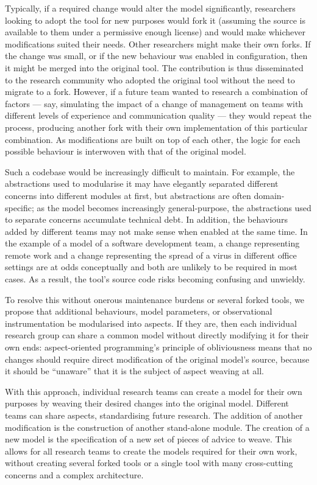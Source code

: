 Typically, if a required change would alter the model significantly, researchers
looking to adopt the tool for new purposes would fork it (assuming the source is
available to them under a permissive enough license) and would make whichever
modifications suited their needs. Other researchers might make their own forks.
If the change was small, or if the new behaviour was enabled in configuration,
then it might be merged into the original tool. The contribution is thus
disseminated to the research community who adopted the original tool without the
need to migrate to a fork. However, if a future team wanted to research a
combination of factors --- say, simulating the impact of a change of management
on teams with different levels of experience and communication quality --- they
would repeat the process, producing another fork with their own implementation
of this particular combination. As modifications are built on top of each other,
the logic for each possible behaviour is interwoven with that of the original
model.

Such a codebase would be increasingly difficult to maintain. For example, the
abstractions used to modularise it may have elegantly separated different
concerns into different modules at first, but abstractions are often
domain-specific; as the model becomes increasingly general-purpose, the
abstractions used to separate concerns accumulate technical debt. In addition,
the behaviours added by different teams may not make sense when enabled at the
same time. In the example of a model of a software development team, a change
representing remote work and a change representing 
the spread of a virus in different office settings are at odds conceptually and
both are unlikely to be required in most cases. As a result, the tool's source
code risks becoming confusing and unwieldy.

To resolve this without onerous maintenance burdens or several forked tools, we
propose that additional behaviours, model parameters, or observational
instrumentation be 
modularised into aspects. If they are, then each individual research group can
share a common model without directly modifying it for their own ends:
aspect-oriented programming's principle of obliviousness means that no changes
should require direct modification of the original model's source, because it
should be ``unaware'' that it is the subject of aspect weaving at all.

With this approach, individual research teams can create a model for their own purposes by weaving
their desired changes into the original model. Different teams can share
aspects, standardising future research. The addition of another modification is
the construction of another stand-alone module. The creation of a new model
is the specification of a new set of pieces of advice to weave. This allows for
all research teams to create the models required for their own work, without
creating several forked tools or a single tool with many cross-cutting concerns
and a complex architecture.

